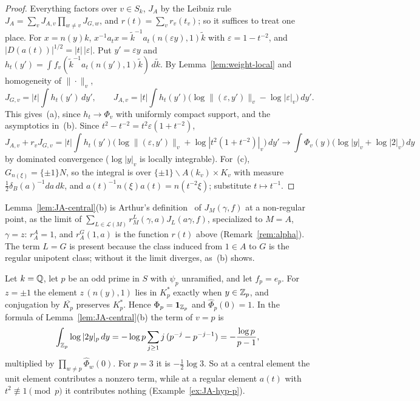 \begin{proof}
Everything factors over $v\in S_k$, $J_A$ by the Leibniz rule
$J_A=\sum_vJ_{A,v}\prod_{w\ne v}J_{G,w}$, and $r(t)=\sum_vr_v(t_v)$; so
it suffices to treat one place. For $x=n(y)k$,
$x^{-1}a_tx=\tilde k^{-1}a_t(n(\varepsilon y),1)\tilde k$ with
$\varepsilon=1-t^{-2}$, and $|D(a(t))|^{1/2}=|t|\,|\varepsilon|$. Put
$y'=\varepsilon y$ and $h_t(y')=\int f_v(\tilde k^{-1}a_t(n(y'),1)
\tilde k)\,d\tilde k$. By Lemma~\ref{lem:weight-local} and homogeneity of
$\|\cdot\|_v$,
\[
J_{G,v}=|t|\int h_t(y')\,dy',\qquad
J_{A,v}=|t|\int h_t(y')\bigl(\log\|(\varepsilon,y')\|_v-\log|\varepsilon|_v
\bigr)\,dy'.
\]
This gives~(a), since $h_t\to\Phi_v$ with uniformly compact support, and
the asymptotics in~(b). Since $t^2-t^{-2}=t^2\varepsilon(1+t^{-2})$,
\[
J_{A,v}+r_vJ_{G,v}=|t|\int h_t(y')\bigl(\log\|(\varepsilon,y')\|_v+
\log|t^2(1+t^{-2})|_v\bigr)\,dy'\to\int\Phi_v(y)\bigl(\log|y|_v+
\log|2|_v\bigr)\,dy
\]
by dominated convergence ($\log|y|_v$ is locally integrable). For~(c),
$G_{n(\xi)}=\{\pm1\}N$, so the integral is over $\{\pm1\}\backslash
A(k_v)\times K_v$ with measure $\tfrac12\delta_B(a)^{-1}da\,dk$, and
$a(t)^{-1}n(\xi)a(t)=n(t^{-2}\xi)$; substitute $t\mapsto t^{-1}$.
\end{proof}

Lemma~\ref{lem:JA-central}(b) is Arthur's definition~\cite[(8.1)]{Ar88a} of
$J_M(\gamma,f)$ at a non-regular point, as the limit of
$\sum_{L\in\mathcal L(M)}r_M^L(\gamma,a)J_L(a\gamma,f)$, specialized to
$M=A$, $\gamma=z$: $r^A_A=1$, and $r^G_A(1,a)$ is the function $r(t)$
above (Remark~\ref{rem:alpha}). The term $L=G$ is present because the
class induced from $1\in A$ to $G$ is the regular unipotent class; without
it the limit diverges, as~(b) shows.

\begin{example}\label{ex:JA-central-p}
Let $k=\mathbb{Q}$, let $p$ be an odd prime in $S$ with $\psi_p$ unramified, and
let $f_p=e_p$. For $z=\pm1$ the element $z\,(n(y),1)$ lies in $K_p^*$
exactly when $y\in\mathbb{Z}_p$, and conjugation by $\overline{K_p}$ preserves
$K_p^*$. Hence $\Phi_p=\mathbf 1_{\mathbb{Z}_p}$ and $\hat\Phi_p(0)=1$. In the
formula of Lemma~\ref{lem:JA-central}(b) the term of $v=p$ is
\[
\int_{\mathbb{Z}_p}\log|2y|_p\,dy=-\log p\sum_{j\ge1}j\,(p^{-j}-p^{-j-1})
=-\frac{\log p}{p-1},
\]
multiplied by $\prod_{w\ne p}\hat\Phi_w(0)$. For $p=3$ it is
$-\frac12\log3$. So at a central element the unit element contributes a
nonzero term, while at a regular element $a(t)$ with
$t^2\not\equiv1\pmod p$ it contributes nothing
(Example~\ref{ex:JA-hyp-p}).
\end{example}


